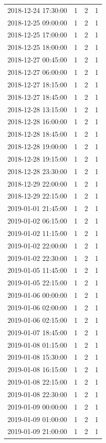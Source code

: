 \begin{tabular}{lrrr}
2018-12-24 17:30:00 & 1 & 2 & 1 \\
2018-12-25 09:00:00 & 1 & 2 & 1 \\
2018-12-25 17:00:00 & 1 & 2 & 1 \\
2018-12-25 18:00:00 & 1 & 2 & 1 \\
2018-12-27 00:45:00 & 1 & 2 & 1 \\
2018-12-27 06:00:00 & 1 & 2 & 1 \\
2018-12-27 18:15:00 & 1 & 2 & 1 \\
2018-12-27 18:45:00 & 1 & 2 & 1 \\
2018-12-28 13:15:00 & 1 & 2 & 1 \\
2018-12-28 16:00:00 & 1 & 2 & 1 \\
2018-12-28 18:45:00 & 1 & 2 & 1 \\
2018-12-28 19:00:00 & 1 & 2 & 1 \\
2018-12-28 19:15:00 & 1 & 2 & 1 \\
2018-12-28 23:30:00 & 1 & 2 & 1 \\
2018-12-29 22:00:00 & 1 & 2 & 1 \\
2018-12-29 22:15:00 & 1 & 2 & 1 \\
2019-01-01 21:45:00 & 1 & 2 & 1 \\
2019-01-02 06:15:00 & 1 & 2 & 1 \\
2019-01-02 11:15:00 & 1 & 2 & 1 \\
2019-01-02 22:00:00 & 1 & 2 & 1 \\
2019-01-02 22:30:00 & 1 & 2 & 1 \\
2019-01-05 11:45:00 & 1 & 2 & 1 \\
2019-01-05 22:15:00 & 1 & 2 & 1 \\
2019-01-06 00:00:00 & 1 & 2 & 1 \\
2019-01-06 02:00:00 & 1 & 2 & 1 \\
2019-01-06 02:15:00 & 1 & 2 & 1 \\
2019-01-07 18:45:00 & 1 & 2 & 1 \\
2019-01-08 01:15:00 & 1 & 2 & 1 \\
2019-01-08 15:30:00 & 1 & 2 & 1 \\
2019-01-08 16:15:00 & 1 & 2 & 1 \\
2019-01-08 22:15:00 & 1 & 2 & 1 \\
2019-01-08 22:30:00 & 1 & 2 & 1 \\
2019-01-09 00:00:00 & 1 & 2 & 1 \\
2019-01-09 01:00:00 & 1 & 2 & 1 \\
2019-01-09 21:00:00 & 1 & 2 & 1 \\

\end{tabular}
